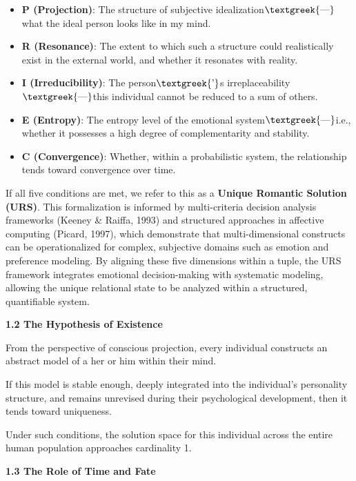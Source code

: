 \documentclass[a4paper]{article}
\begin{document}
\begin{itemize}[series=listWWNumi]
\item \textbf{P (Projection)}: The structure of subjective idealization$\text{\textgreek{—}}${\textquotedbl}what the
ideal person looks like in my mind.{\textquotedbl}
\item \textbf{R (Resonance)}: The extent to which such a structure could realistically exist in the external world, and
whether it resonates with reality.
\item \textbf{I (Irreducibility)}: The person$\text{\textgreek{’}}$s irreplaceability$\text{\textgreek{—}}$this
individual cannot be reduced to a sum of others.
\item \textbf{E (Entropy)}: The entropy level of the emotional system$\text{\textgreek{—}}$i.e., whether it possesses a
high degree of complementarity and stability.
\item \textbf{C (Convergence)}: Whether, within a probabilistic system, the relationship tends toward convergence over
time.
\end{itemize}
If all five conditions are met, we refer to this as a \textbf{Unique Romantic Solution (URS)}.\newline
This formalization is informed by multi-criteria decision analysis frameworks (Keeney \& Raiffa, 1993) and structured
approaches in affective computing (Picard, 1997), which demonstrate that multi-dimensional constructs can be
operationalized for complex, subjective domains such as emotion and preference modeling. By aligning these five
dimensions within a tuple, the URS framework integrates emotional decision-making with systematic modeling, allowing
the unique relational state to be analyzed within a structured, quantifiable system. 

\textbf{1.2 The Hypothesis of Existence}

From the perspective of conscious projection, every individual constructs an abstract model of a
{\textquotedbl}her{\textquotedbl} or {\textquotedbl}him{\textquotedbl} within their mind.

If this model is stable enough, deeply integrated into the individual's personality structure, and remains unrevised
during their psychological development, then it tends toward uniqueness.

Under such conditions, the solution space for this individual across the entire human population approaches cardinality
1.

\textbf{1.3 The Role of Time and Fate}
\end{document}
